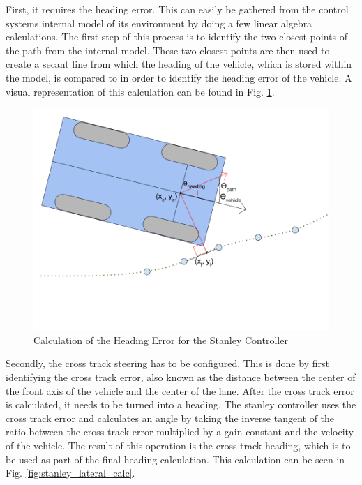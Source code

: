 \documentclass[titlepage,draft]{article}
\begin{document}
{First, it requires the heading error. This can easily be gathered from the control systems internal model of its environment by doing a few linear algebra calculations. The first step of this process is to identify the two closest points of the path from the internal model. These two closest points are then used to create a secant line from which the heading of the vehicle, which is stored within the model, is compared to in order to identify the heading error of the vehicle. A visual representation of this calculation can be found in Fig. \ref{fig:stanley_heading_calc}.

\begin{figure}
	\centering
	\includegraphics[width=5in]{stanley_heading_error}
	\caption{Calculation of the Heading Error for the Stanley Controller}
	\label{fig:stanley_heading_calc}
\end{figure}

Secondly, the cross track steering has to be configured. This is done by first identifying the cross track error, also known as the distance between the center of the front axis of the vehicle and the center of the lane. After the cross track error is calculated, it needs to be turned into a heading. The stanley controller uses the cross track error and calculates an angle by taking the inverse tangent of the ratio between the cross track error multiplied by a gain constant and the velocity of the vehicle. The result of this operation is the cross track heading, which is to be used as part of the final heading calculation. This calculation can be seen in Fig. \ref{fig:stanley_lateral_calc}.

}
\end{document}
